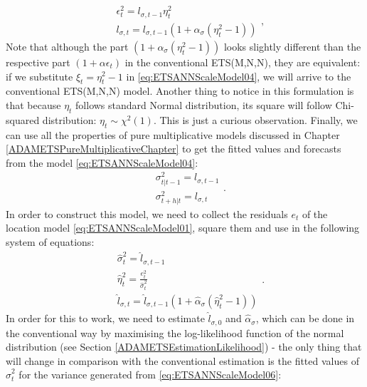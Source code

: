 \documentclass[
]{book}
\theoremstyle{definition}
\theoremstyle{definition}
\theoremstyle{definition}
\theoremstyle{definition}
\theoremstyle{remark}
\begin{document}
\begin{equation}
  \begin{aligned}
    &\epsilon_t^2 = l_{\sigma,t-1} \eta_t^2 \\
    &l_{\sigma,t} = l_{\sigma,t-1} \left(1 + \alpha_\sigma (\eta_t^2-1)\right)
  \end{aligned},
  \label{eq:ETSANNScaleModel04}
\end{equation}
Note that although the part \(\left(1 + \alpha_\sigma (\eta_t^2-1)\right)\) looks slightly different than the respective part \(\left(1 + \alpha \epsilon_t \right)\) in the conventional ETS(M,N,N), they are equivalent: if we substitute \(\xi_t = \eta_t^2-1\) in \eqref{eq:ETSANNScaleModel04}, we will arrive to the conventional ETS(M,N,N) model. Another thing to notice in this formulation is that because \(\eta_t\) follows standard Normal distribution, its square will follow Chi-squared distribution: \(\eta_t \sim \chi^2(1)\). This is just a curious observation. Finally, we can use all the properties of pure multiplicative models discussed in Chapter \ref{ADAMETSPureMultiplicativeChapter} to get the fitted values and forecasts from the model \eqref{eq:ETSANNScaleModel04}:
\begin{equation}
  \begin{aligned}
    &\sigma_{t|t-1}^2 = l_{\sigma,t-1} \\
    &\sigma_{t+h|t}^2 = l_{\sigma,t} 
  \end{aligned}.
  \label{eq:ETSANNScaleModel05}
\end{equation}
In order to construct this model, we need to collect the residuals \(e_t\) of the location model \eqref{eq:ETSANNScaleModel01}, square them and use in the following system of equations:
\begin{equation}
  \begin{aligned}
    &\hat{\sigma}^2_{t} = \hat{l}_{\sigma,t-1} \\
    &\hat{\eta}_t^2 = \frac{e_t^2}{\hat{\sigma}^2_{t}} \\
    &\hat{l}_{\sigma,t} = \hat{l}_{\sigma,t-1} (1 + \hat{\alpha}_\sigma (\hat{\eta}_t^2-1))
  \end{aligned}.
  \label{eq:ETSANNScaleModel06}
\end{equation}
In order for this to work, we need to estimate \(\hat{l}_{\sigma,0}\) and \(\hat{\alpha}_\sigma\), which can be done in the conventional way by maximising the log-likelihood function of the normal distribution (see Section \ref{ADAMETSEstimationLikelihood}) - the only thing that will change in comparison with the conventional estimation is the fitted values of \(\hat{\sigma}^2_{t}\) for the variance generated from \eqref{eq:ETSANNScaleModel06}:
\end{document}
